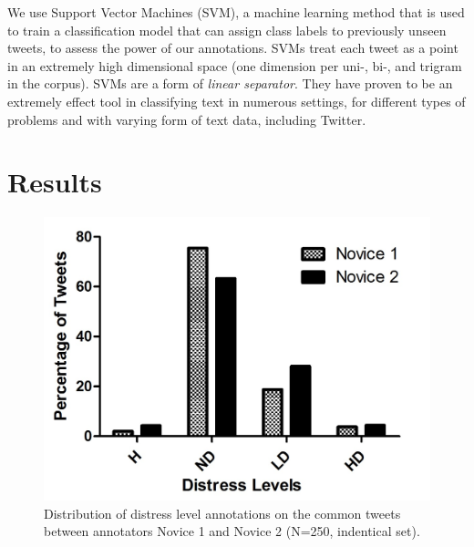 \documentclass[11pt]{article}
\begin{document}
We use Support Vector Machines (SVM), a machine learning method that is used to train a classification model that can assign class labels to previously unseen tweets, to assess the power of our annotations. SVMs treat each tweet as a point in an extremely high dimensional space (one dimension per uni-, bi-, and trigram in the corpus). SVMs are a form of \emph{linear separator}. They have proven to be an extremely effect tool in classifying text in numerous settings, for different types of problems and with varying form of text data, including Twitter. 


\section{Results}


\begin{figure}[h]
\centering
\includegraphics[scale=0.65]{ChrisCissi4cat.jpg}
\caption{Distribution of distress level annotations on the common tweets between annotators Novice 1 and Novice 2 (N=250, indentical set).}
\label{fig:distress-distrib1}
\end{figure}
\end{document}
